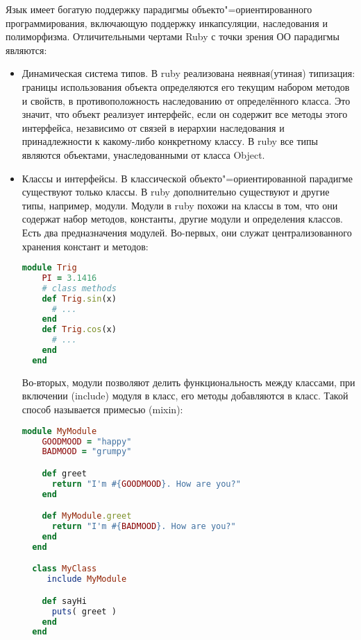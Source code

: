 Язык имеет богатую поддержку парадигмы объекто"=ориентированного программирования, включающую поддержку инкапсуляции, наследования и полиморфизма.
Отличительными чертами Ruby с точки зрения ОО парадигмы являются:
\begin{itemize}
  \item Динамическая система типов.
        В ruby реализована неявная(утиная) типизация: границы использования объекта определяются его текущим набором методов и свойств, в противоположность наследованию от определённого класса. Это значит, что объект реализует интерфейс, если он содержит все методы этого интерфейса, независимо от связей в иерархии наследования и принадлежности к какому-либо конкретному классу.
        В ruby все типы являются объектами, унаследованными от класса Object.
  \item Классы и интерфейсы.
        В классической объекто"=ориентированной парадигме существуют только классы.
        В ruby дополнительно существуют и другие типы, например, модули.
        Модули в ruby похожи на классы в том, что они содержат набор методов, константы, другие модули и определения классов.
        Есть два предназначения модулей. Во-первых, они служат централизованного хранения констант и методов:
        \begin{lstlisting}[language=Ruby, style=rubystyle]
  module Trig
    PI = 3.1416
    # class methods
    def Trig.sin(x)
      # ...
    end
    def Trig.cos(x)
      # ...
    end
  end
        \end{lstlisting}

        Во-вторых, модули позволяют делить функциональность между классами, при включении (include) модуля в класс, его методы добавляются в класс. Такой способ называется примесью (mixin):

        \begin{lstlisting}[language=Ruby, style=rubystyle]
  module MyModule
    GOODMOOD = "happy"
    BADMOOD = "grumpy"

    def greet
      return "I'm #{GOODMOOD}. How are you?"
    end

    def MyModule.greet
      return "I'm #{BADMOOD}. How are you?"
    end
  end

  class MyClass
     include MyModule

    def sayHi
      puts( greet )
    end
  end


\end{lstlisting}
\end{itemize}
